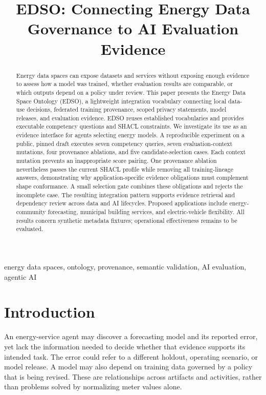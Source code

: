 \documentclass[conference]{IEEEtran}
\title{EDSO: Connecting Energy Data Governance to AI Evaluation Evidence}
\author{\IEEEauthorblockN{Mohammed Al-Rawi}
\IEEEauthorblockA{Instituto de Telecomunica\c{c}\~oes\\Aveiro, Portugal}}
\begin{document}
\maketitle
\begin{abstract}
Energy data spaces can expose datasets and services without exposing enough evidence to assess how a model was trained, whether evaluation results are comparable, or which outputs depend on a policy under review. This paper presents the Energy Data Space Ontology (EDSO), a lightweight integration vocabulary connecting local data-use decisions, federated training provenance, scoped privacy statements, model releases, and evaluation evidence. EDSO reuses established vocabularies and provides executable competency questions and SHACL constraints. We investigate its use as an evidence interface for agents selecting energy models. A reproducible experiment on a public, pinned draft executes seven competency queries, seven evaluation-context mutations, four provenance ablations, and five candidate-selection cases. Each context mutation prevents an inappropriate score pairing. One provenance ablation nevertheless passes the current SHACL profile while removing all training-lineage answers, demonstrating why application-specific evidence obligations must complement shape conformance. A small selection gate combines these obligations and rejects the incomplete case. The resulting integration pattern supports evidence retrieval and dependency review across data and AI lifecycles. Proposed applications include energy-community forecasting, municipal building services, and electric-vehicle flexibility. All results concern synthetic metadata fixtures; operational effectiveness remains to be evaluated.
\end{abstract}
\begin{IEEEkeywords}
energy data spaces, ontology, provenance, semantic validation, AI evaluation, agentic AI
\end{IEEEkeywords}

\section{Introduction}
An energy-service agent may discover a forecasting model and its reported error, yet lack the information needed to decide whether that evidence supports its intended task. The error could refer to a different holdout, operating scenario, or model release. A model may also depend on training data governed by a policy that is being revised. These are relationships across artifacts and activities, rather than problems solved by normalizing meter values alone.
\end{document}

